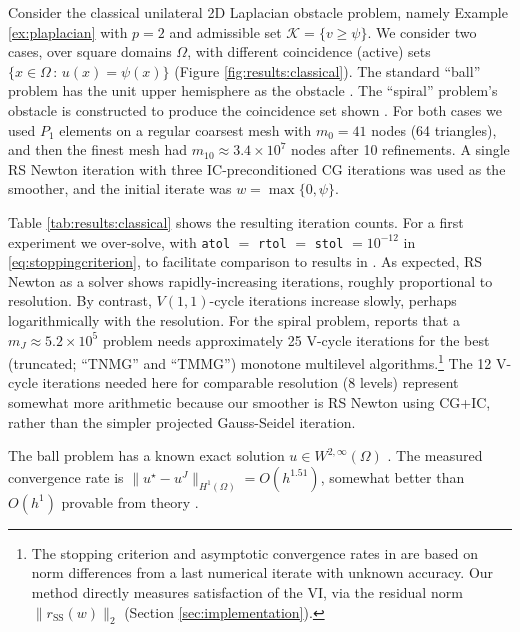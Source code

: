 \documentclass[review,hidelinks,onefignum,onetabnum,final]{siamart220329}  %
\newcommand{\rSS}{r_{\text{SS}}}
\begin{document}
\begin{example} \label{ex:results:classical}
Consider the classical unilateral 2D Laplacian obstacle problem, namely Example \ref{ex:plaplacian} with $p=2$ and admissible set $\mathcal{K} = \{v \ge \psi\}$.  We consider two cases, over square domains $\Omega$, with different coincidence (active) sets $\{x\in\Omega \,:\, u(x)=\psi(x)\}$ (Figure \ref{fig:results:classical}).  The standard ``ball'' problem has the unit upper hemisphere as the obstacle \cite[Chapter 12]{Bueler2021}.  The ``spiral'' problem's obstacle is constructed to produce the coincidence set shown \cite[problem 7.1.1]{GraeserKornhuber2009}.  For both cases we used $P_1$ elements on a regular coarsest mesh with $m_0=41$ nodes (64 triangles), and then the finest mesh had $m_{10} \approx 3.4 \times 10^7$ nodes after 10 refinements.  A single RS Newton iteration with three IC-preconditioned CG iterations was used as the smoother, and the initial iterate was $w=\max\{0,\psi\}$.

Table \ref{tab:results:classical} shows the resulting iteration counts.  For a first experiment we over-solve, with \texttt{atol} $=$ \texttt{rtol} $=$ \texttt{stol} $= 10^{-12}$ in \eqref{eq:stoppingcriterion}, to facilitate comparison to results in \cite[section 7]{GraeserKornhuber2009}.  As expected, RS Newton as a solver shows rapidly-increasing iterations, roughly proportional to resolution.  By contrast, $V(1,1)$-cycle iterations increase slowly, perhaps logarithmically with the resolution.  For the spiral problem, \cite[Figure 7.11]{GraeserKornhuber2009} reports that a $m_J \approx 5.2 \times 10^5$ problem needs approximately 25 V-cycle iterations for the best (truncated;  ``TNMG'' and ``TMMG'') monotone multilevel algorithms.\footnote{The stopping criterion and asymptotic convergence rates in \cite{GraeserKornhuber2009} are based on norm differences from a last numerical iterate with unknown accuracy.  Our method directly measures satisfaction of the VI, via the residual norm $\|\rSS(w)\|_2$ (Section \ref{sec:implementation}).}  The 12 V-cycle iterations needed here for comparable resolution (8 levels) represent somewhat more arithmetic because our smoother is RS Newton using CG+IC, rather than the simpler projected Gauss-Seidel iteration.

The ball problem has a known exact solution $u\in W^{2,\infty}(\Omega)$ \cite{Bueler2021,Tai2003}.  The measured convergence rate is $\|u^\star-u^J\|_{H^1(\Omega)}=O(h^{1.51})$, somewhat better than $O(h^1)$ provable from theory \cite[section 5.1]{Ciarlet2002}.


\end{example}
\end{document}
